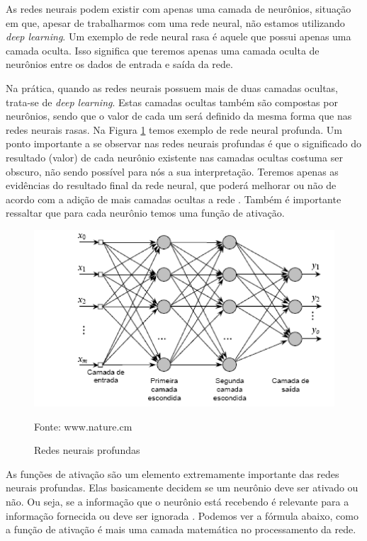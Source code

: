 \documentclass[openright]{UFRGS} %
\begin{document}
As redes neurais podem existir com apenas uma camada de neurônios, situação em que, apesar de trabalharmos com uma rede neural, não estamos utilizando \textit{deep learning}.
Um exemplo de rede neural rasa é aquele que possui apenas uma camada oculta. Isso significa que teremos apenas uma camada oculta de neurônios entre os dados de entrada e saída da rede.

Na prática, quando as redes neurais possuem mais de duas camadas ocultas, trata-se de \textit{deep learning}. Estas camadas ocultas também são compostas por neurônios, sendo que o valor de cada um será definido da mesma forma que nas redes neurais rasas. Na Figura \ref{fig:redesneuraisprof} temos exemplo de rede neural profunda. Um ponto importante a se observar nas redes neurais profundas é que o significado do resultado (valor) de cada neurônio existente nas camadas ocultas costuma ser obscuro, não sendo possível para nós a sua interpretação. Teremos apenas as evidências do resultado final da rede neural, que poderá melhorar ou não de acordo com a adição de mais camadas ocultas a rede \cite{goodfellow2016deep}. Também é importante ressaltar que para cada neurônio temos uma função de ativação.

\begin{figure}[h]
    \centering
    \caption{Redes neurais profundas}
    \includegraphics[scale=0.40]{redesneuraisprofundas.png}
    \centerline{Fonte: www.nature.cm}
    \label{fig:redesneuraisprof}
\end{figure}


As funções de ativação são um elemento extremamente importante das redes neurais profundas. Elas basicamente decidem se um neurônio deve ser ativado ou não. Ou seja, se a informação que o neurônio está recebendo é relevante para a informação fornecida ou deve ser ignorada \cite{goodfellow2016deep}. Podemos ver a fórmula abaixo, como a função de ativação é mais uma camada matemática no processamento da rede.
\end{document}

